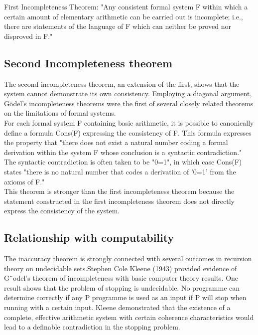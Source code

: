 \documentclass[10pt,a4paper,twoside]{article}
\begin{document}
First Incompleteness Theorem: "Any consistent formal system F within which a certain amount of elementary arithmetic can be carried out is incomplete; i.e., there are statements of the language of F which can neither be proved nor disproved in F."

\subsection{Second Incompleteness theorem}
The second incompleteness theorem, an extension of the first, shows that the system cannot demonstrate its own consistency. Employing a diagonal argument, Gödel's incompleteness theorems were the first of several closely related theorems on the limitations of formal systems.\\

For each formal system F containing basic arithmetic, it is possible to canonically define a formula Cons(F) expressing the consistency of F. This formula expresses the property that "there does not exist a natural number coding a formal derivation within the system F whose conclusion is a syntactic contradiction." The syntactic contradiction is often taken to be "0=1", in which case Cons(F) states "there is no natural number that codes a derivation of '0=1' from the axioms of F."\\
This theorem is stronger than the first incompleteness theorem because the statement constructed in the first incompleteness theorem does not directly express the consistency of the system.
 \subsection{Relationship with computability}
The inaccuracy theorem is strongly connected with several outcomes in recursion theory
on undecidable sets.Stephen Cole Kleene (1943) provided evidence of G¨odel’s theorem of
incompleteness with basic computer theory results. One result shows that the problem of
stopping is undecidable. No programme can determine correctly if any P programme is used
as an input if P will stop when running with a certain input. Kleene demonstrated that the
existence of a complete, effective arithmetic system with certain coherence characteristics
would lead to a definable contradiction in the stopping problem.



 



 
\end{document}
